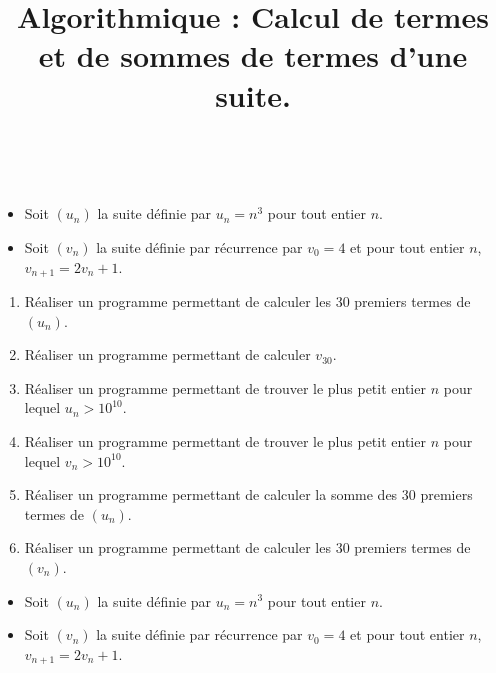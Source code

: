\documentclass[a4paper,11pt]{article}
\title{Algorithmique : Calcul de termes et de sommes de termes d'une suite.}
\author{}
\date{}
\theoremstyle{break}
\begin{document}
\maketitle
  \setlength{\unitlength}{1mm}
  \setlength\parindent{0mm}
  
  
  ~
  \medskip
  
  \iffalse

 \fi
    
  
  \begin{itemize}
   \item  Soit $(u_n)$ la suite définie par $u_n=n^3$ pour tout entier $n$.
   \item Soit $(v_n)$ la suite définie par récurrence par $v_0=4$ et pour tout entier $n$, $v_{n+1}=2v_n+1$.
  \end{itemize}
  
  \begin{enumerate}
  \item
  Réaliser un programme permettant de calculer les 30 premiers termes de $(u_n)$. 
  
    \item
  Réaliser un programme permettant de calculer $v_{30}$. 
  
  \item 
  Réaliser un programme permettant de trouver le plus petit entier $n$ pour lequel $u_n>10^{10}$.
  
   \item 
  Réaliser un programme permettant de trouver le plus petit entier $n$ pour lequel $v_n>10^{10}$.
  
  \item
  Réaliser un programme permettant de calculer la somme des 30 premiers termes de $(u_n)$. 
  
  \item 
  Réaliser un programme permettant de calculer les 30 premiers termes de $(v_n)$. 
  
  \end{enumerate}
  
  \newpage
  
  \begin{itemize}
   \item  Soit $(u_n)$ la suite définie par $u_n=n^3$ pour tout entier $n$.
   \item Soit $(v_n)$ la suite définie par récurrence par $v_0=4$ et pour tout entier $n$, $v_{n+1}=2v_n+1$.
  \end{itemize}
  
\end{document}
